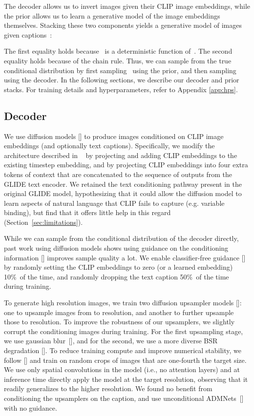 \documentclass{article}
\newcommand{\shortcite}[1]{[\citenum{#1}]}
\newcommand{\namecite}[1]{\citeauthor{#1} [\citenum{#1}]}
\begin{document}
The decoder allows us to invert images given their CLIP image embeddings, while the prior allows us to learn a generative model of the image embeddings themselves. Stacking these two components yields a generative model  of images~ given captions~:


The first equality holds because~ is a deterministic function of~. The second equality holds because of the chain rule. Thus, we can sample from the true conditional distribution  by first sampling~ using the prior, and then sampling~ using the decoder. In the following sections, we describe our decoder and prior stacks. For training details and hyperparameters, refer to Appendix \ref{app:hps}.

\subsection{Decoder}
We use diffusion models \shortcite{ddpm,improvedscore} to produce images conditioned on CLIP image embeddings (and optionally text captions). Specifically, we modify the architecture described in ~\cite{glide} by projecting and adding CLIP embeddings to the existing timestep embedding, and by projecting CLIP embeddings into four extra tokens of context that are concatenated to the sequence of outputs from the GLIDE text encoder. We retained the text conditioning pathway present in the original GLIDE model, hypothesizing that it could allow the diffusion model to learn aspects of natural language that CLIP fails to capture (e.g. variable binding), but find that it offers little help in this regard (Section~\ref{sec:limitations}). 

While we can sample from the conditional distribution of the decoder directly, past work using diffusion models shows using guidance on the conditioning information \shortcite{sotapaper,uncond,glide} improves sample quality a lot. We enable classifier-free guidance \shortcite{uncond} by randomly setting the CLIP embeddings to zero (or a learned embedding) 10\%~of the time, and randomly dropping the text caption 50\%~of the time during training. 

To generate high resolution images, we train two diffusion upsampler models \shortcite{improved,sr3}: one to upsample images from  to  resolution, and another to further upsample those to  resolution. To improve the robustness of our upsamplers, we slightly corrupt the conditioning images during training. For the first upsampling stage, we use gaussian blur~\shortcite{sr3}, and for the second, we use a more diverse BSR degradation \shortcite{latentdiffusion,bsr}. To reduce training compute and improve numerical stability, we follow \namecite{latentdiffusion} and train on random crops of images that are one-fourth the target size. We use only spatial convolutions in the model (i.e., no attention layers) and at inference time directly apply the model at the target resolution, observing that it readily generalizes to the higher resolution. We found no benefit from conditioning the upsamplers on the caption, and use unconditional ADMNets~\shortcite{sotapaper} with no guidance. 
\end{document}
